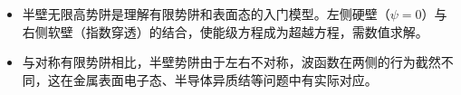 \begin{insightbox}[物理图像]
\begin{itemize}
    \item 半壁无限高势阱是理解有限势阱和表面态的入门模型。左侧硬壁（$\psi=0$）与右侧软壁（指数穿透）的结合，使能级方程成为超越方程，需数值求解。
    \item 与对称有限势阱相比，半壁势阱由于左右不对称，波函数在两侧的行为截然不同，这在金属表面电子态、半导体异质结等问题中有实际对应。
\end{itemize}
\end{insightbox}
